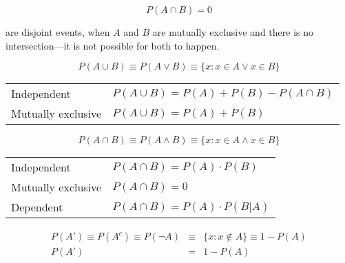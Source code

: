 
\begin{equation}
   P(A \cap B) = 0
\end{equation}

\vspace{.63em}
are disjoint events, when $A$ and $B$ are mutually exclusive and there is no intersection---it is not possible for both to happen.
\hformbar




\begin{equation}
    P(A \cup B) \equiv P(A \vee B) \equiv \{x: x \in A \vee x \in B\}
\end{equation}

\begin{center}
  \begin{tabular}{ll}
    Independent         & $P(A \cup B) = P(A) + P(B) - P(A \cap B)$   \\
    Mutually exclusive  & $P(A \cup B) = P(A) + P(B)$                 \\
  \end{tabular}
\end{center}

\hformbar




\begin{equation}
    P(A \cap B) \equiv P(A \wedge B) \equiv \{x: x \in A \wedge x \in B\}
\end{equation}

\begin{center}
  \begin{tabular}{ll}
    Independent         & $P(A \cap B) = P(A) \cdot P(B)$   \\
    Mutually exclusive  & $P(A \cap B) = 0$                 \\
    Dependent           & $P(A \cap B) = P(A) \cdot P(B|A)$ \\
  \end{tabular}
\end{center}

\hformbar



\begin{eqnarray}
P(A') \equiv P(A^c) \equiv P(\neg A) &\equiv& \{x: x \notin A\} \equiv 1 - P(A) \\
P(A') &=& 1 - P(A)
\end{eqnarray}

